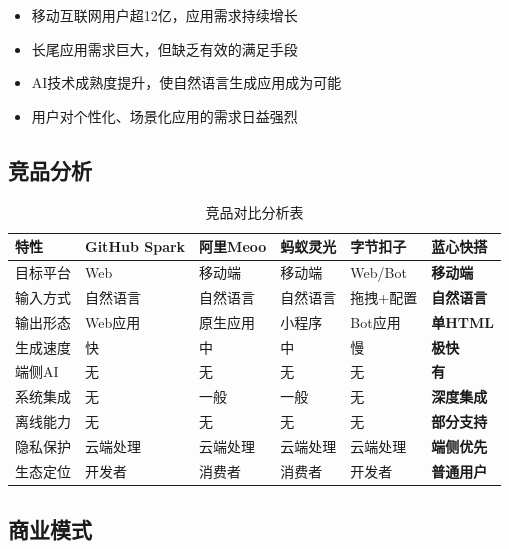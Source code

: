 \documentclass[a4paper,12pt]{ctexart}
\newcommand{\highlight}[1]{\textcolor{vivoblue}{\textbf{#1}}}
\begin{document}
\begin{itemize}[leftmargin=2em]
    \item 移动互联网用户超12亿，应用需求持续增长
    \item 长尾应用需求巨大，但缺乏有效的满足手段
    \item AI技术成熟度提升，使自然语言生成应用成为可能
    \item 用户对个性化、场景化应用的需求日益强烈
\end{itemize}

\subsection{竞品分析}

\begin{table}[H]
    \centering
    \caption{竞品对比分析表}
    \begin{tabularx}{\textwidth}{|l|l|l|l|l|X|}
        \hline
        \textbf{特性} & \textbf{GitHub Spark} & \textbf{阿里Meoo} & \textbf{蚂蚁灵光} & \textbf{字节扣子} & \textbf{蓝心快搭} \\
        \hline
        目标平台 & Web & 移动端 & 移动端 & Web/Bot & \highlight{移动端} \\
        \hline
        输入方式 & 自然语言 & 自然语言 & 自然语言 & 拖拽+配置 & \highlight{自然语言} \\
        \hline
        输出形态 & Web应用 & 原生应用 & 小程序 & Bot应用 & \highlight{单HTML} \\
        \hline
        生成速度 & 快 & 中 & 中 & 慢 & \highlight{极快} \\
        \hline
        端侧AI & 无 & 无 & 无 & 无 & \highlight{有} \\
        \hline
        系统集成 & 无 & 一般 & 一般 & 无 & \highlight{深度集成} \\
        \hline
        离线能力 & 无 & 无 & 无 & 无 & \highlight{部分支持} \\
        \hline
        隐私保护 & 云端处理 & 云端处理 & 云端处理 & 云端处理 & \highlight{端侧优先} \\
        \hline
        生态定位 & 开发者 & 消费者 & 消费者 & 开发者 & \highlight{普通用户} \\
        \hline
    \end{tabularx}
\end{table}

\subsection{商业模式}
\end{document}
